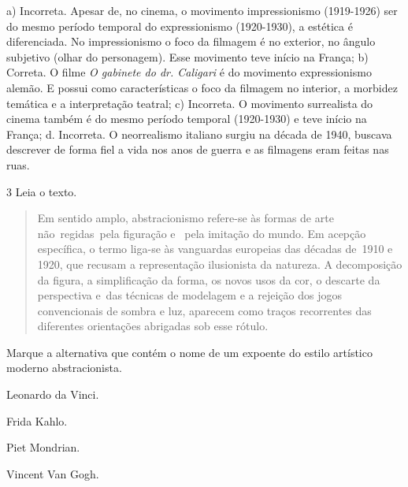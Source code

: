 \begin{escolha}
{a) Incorreta. Apesar de, no cinema, o movimento impressionismo
(1919-1926) ser do mesmo período temporal do expressionismo (1920-1930),
a estética é diferenciada. No impressionismo o foco da filmagem é no
exterior, no ângulo subjetivo (olhar do personagem). Esse movimento teve
início na França;
b) Correta. O filme \emph{O gabinete do dr. Caligari} é do movimento
expressionismo alemão. E possui como características o foco da filmagem
no interior, a morbidez temática e a interpretação teatral;
c) Incorreta. O movimento surrealista do cinema também é do mesmo
período temporal (1920-1930) e teve início na França;
d. Incorreta. O neorrealismo italiano surgiu na década de 1940, buscava
descrever de forma fiel a vida nos anos de guerra e as filmagens eram
feitas nas ruas.}

\num{3}  Leia o texto.

\begin{quote}
Em sentido amplo, abstracionismo refere-se às formas de arte
não~regidas~pela figuração e~ pela imitação do mundo. Em acepção
específica, o termo liga-se às vanguardas europeias das décadas de~1910
e 1920, que recusam a representação ilusionista da natureza. A
decomposição da figura, a simplificação da forma, os novos usos da cor,
o descarte da perspectiva e~das técnicas de modelagem e a rejeição dos
jogos convencionais de sombra e luz, aparecem como traços recorrentes
das diferentes orientações abrigadas sob esse rótulo.

\end{quote}

Marque a alternativa que contém o nome de um expoente do estilo
artístico moderno abstracionista.

\begin{escolha}
\item Leonardo da Vinci.

\item Frida Kahlo.

\item Piet Mondrian.

\item Vincent Van Gogh.
\end{escolha}

\end{escolha}
